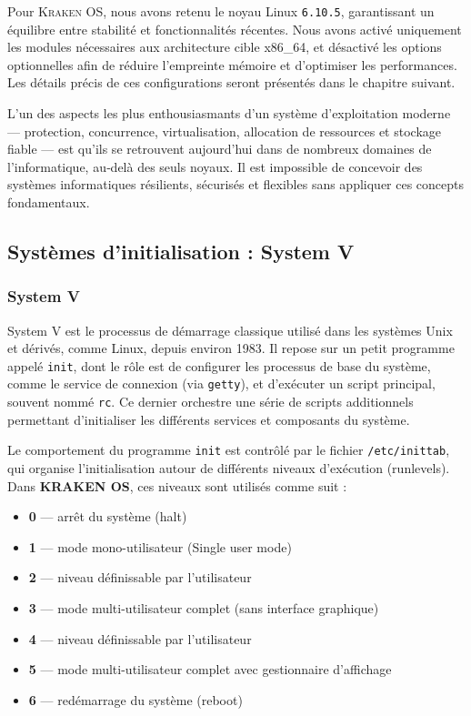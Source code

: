 Pour \textsc{Kraken OS}, nous avons retenu le noyau Linux \texttt{6.10.5}, garantissant un équilibre entre stabilité et fonctionnalités récentes. Nous avons activé uniquement les modules nécessaires aux architecture cible  x86\_64, et désactivé les options optionnelles afin de réduire l’empreinte mémoire et d’optimiser les performances. Les détails précis de ces configurations seront présentés dans le chapitre suivant.

\bigskip
L’un des aspects les plus enthousiasmants d’un système d’exploitation moderne — protection, concurrence, virtualisation, allocation de ressources et stockage fiable — est qu’ils se retrouvent aujourd’hui dans de nombreux domaines de l’informatique, au‑delà des seuls noyaux. Il est impossible de concevoir des systèmes informatiques résilients, sécurisés et flexibles sans appliquer ces concepts fondamentaux.

\subsection{Systèmes d'initialisation : System V}

\subsubsection{System V}

System V est le processus de démarrage classique utilisé dans les systèmes Unix et dérivés, comme Linux, depuis environ 1983. Il repose sur un petit programme appelé \texttt{init}, dont le rôle est de configurer les processus de base du système, comme le service de connexion (via \texttt{getty}), et d’exécuter un script principal, souvent nommé \texttt{rc}. Ce dernier orchestre une série de scripts additionnels permettant d'initialiser les différents services et composants du système.

Le comportement du programme \texttt{init} est contrôlé par le fichier \texttt{/etc/inittab}, qui organise l'initialisation autour de différents niveaux d'exécution (runlevels). Dans \textbf{KRAKEN OS}, ces niveaux sont utilisés comme suit :

\begin{itemize}
  \item \textbf{0} — arrêt du système (halt)
  \item \textbf{1} — mode mono-utilisateur (Single user mode)
  \item \textbf{2} — niveau définissable par l'utilisateur
  \item \textbf{3} — mode multi-utilisateur complet (sans interface graphique)
  \item \textbf{4} — niveau définissable par l'utilisateur
  \item \textbf{5} — mode multi-utilisateur complet avec gestionnaire d'affichage
  \item \textbf{6} — redémarrage du système (reboot)
\end{itemize}

